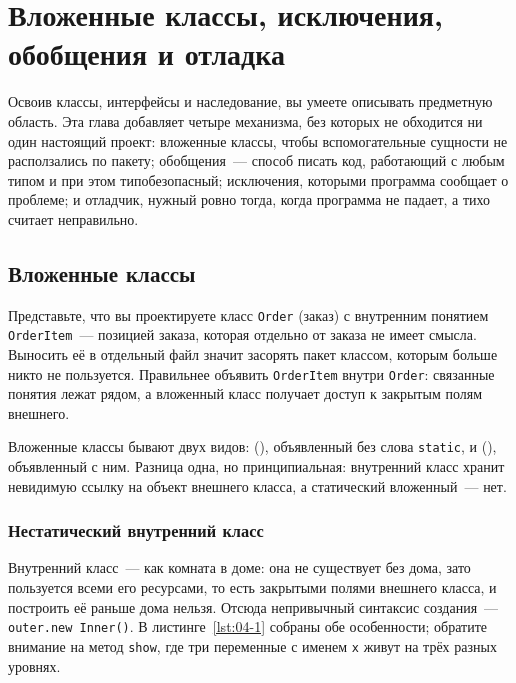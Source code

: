 \chapter{Вложенные классы, исключения, обобщения и отладка}
\label{ch:04}

Освоив классы, интерфейсы и наследование, вы умеете описывать предметную
область. Эта глава добавляет четыре механизма, без которых не обходится ни один
настоящий проект: вложенные классы, чтобы вспомогательные сущности не
расползались по пакету; обобщения~--- способ писать код, работающий с любым
типом и при этом типобезопасный; исключения, которыми программа сообщает о
проблеме; и отладчик, нужный ровно тогда, когда программа не падает, а тихо
считает неправильно.

\section{Вложенные классы}

Представьте, что вы проектируете класс \texttt{Order} (заказ) с внутренним
понятием \texttt{OrderItem}~--- позицией заказа, которая отдельно от заказа не
имеет смысла. Выносить её в отдельный файл значит засорять пакет классом,
которым больше никто не пользуется. Правильнее объявить \texttt{OrderItem}
внутри \texttt{Order}: связанные понятия лежат рядом, а вложенный класс
получает доступ к закрытым полям внешнего.

Вложенные классы бывают двух видов: 
(), объявленный без слова \texttt{static}, и  (), объявленный с ним. Разница одна,
но принципиальная: внутренний класс хранит невидимую ссылку на объект внешнего
класса, а статический вложенный~--- нет.

\subsection{Нестатический внутренний класс}

Внутренний класс~--- как комната в доме: она не существует без дома, зато
пользуется всеми его ресурсами, то есть закрытыми полями внешнего класса, и
построить её раньше дома нельзя. Отсюда непривычный синтаксис создания~---
\texttt{outer.new Inner()}. В листинге~\ref{lst:04-1} собраны обе особенности;
обратите внимание на метод \texttt{show}, где три переменные с именем
\texttt{x} живут на трёх разных уровнях.

